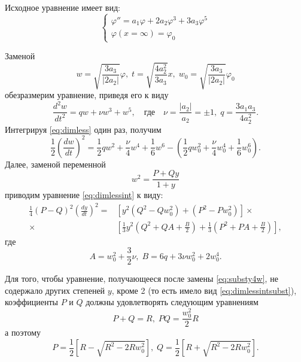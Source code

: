Исходное уравнение имеет вид:
\begin{equation}\label{}
\begin{cases}
\varphi'' = a_1\varphi + 2a_2 \varphi^3 + 3a_3\varphi^5\\
\varphi(x=\infty) = \varphi_0
\end{cases}
\end{equation}

Заменой
\begin{equation}
w = \sqrt{\frac{3a_3}{|2a_2|}}\varphi,\;
t = \sqrt{\frac{4a_2^2}{3a_3}}x,\;
w_0 = \sqrt{\frac{3a_3}{|2a_2|}}\varphi_0
\end{equation}
обезразмерим уравнение, приведя его к виду
\begin{equation}\label{eq:dimless}
\frac{d^2 w}{dt^2} = qw + \nu w^3 + w^5,
\quad\text{где}\quad
\nu = \frac{|a_2|}{a_2} = \pm1,\; q = \frac{3a_1 a_3}{4a_2^2}.
\end{equation}
Интегрируя \eqref{eq:dimless} один раз, получим
\begin{equation}\label{eq:dimlessint}
\frac{1}{2}\left(\frac{dw}{dt}\right)^2 = 
\frac{1}{2}qw^2 + \frac{\nu}{4}w^4 + \frac{1}{6}w^6 - 
\left( \frac{1}{2}qw_0^2 + \frac{\nu}{4}w_0^4 + \frac{1}{6}w_0^6\right).
\end{equation}
Далее, заменой переменной
\begin{equation}\label{eq:substy4w}
w^2 = \frac{P+Qy}{1+y}
\end{equation}
приводим уравнение \eqref{eq:dimlessint} к виду:
\begin{equation}\label{eq:dimlessintsubst}
\begin{aligned}
\frac{1}{4}(P-Q)^2 \left(\frac{dy}{dt}\right)^2= 
&\left[y^2(Q^2-Qw_0^2) + (P^2 - Pw_0^2)\right] \times \\
\times &\left[\frac{1}{3}y^2(Q^2+QA+\frac{B}{2}) + 
\frac{1}{3}(P^2 + PA +\frac{B}{2})\right],
\end{aligned}
\end{equation}
где
\begin{equation*}
A = w_0^2 + \frac{3}{2}\nu, \; 
B = 6q + 3\nu w_0^2 + 2w_0^4.
\end{equation*}

Для того, чтобы уравнение, получающееся после замены \eqref{eq:substy4w}, не содержало других степеней $y$, кроме 2 (то есть имело вид \eqref{eq:dimlessintsubst}), коэффициенты $P$ и $Q$ должны удовлетворять следующим уравнениям
\begin{equation}
P+Q = R, \; PQ = \frac{w_0^2}{2}R
\end{equation}
а поэтому
\begin{equation}
P = \frac{1}{2}\left[R - \sqrt{R^2 - 2Rw_0^2}\right], \;
Q = \frac{1}{2}\left[R + \sqrt{R^2 - 2Rw_0^2}\right].
\end{equation}

